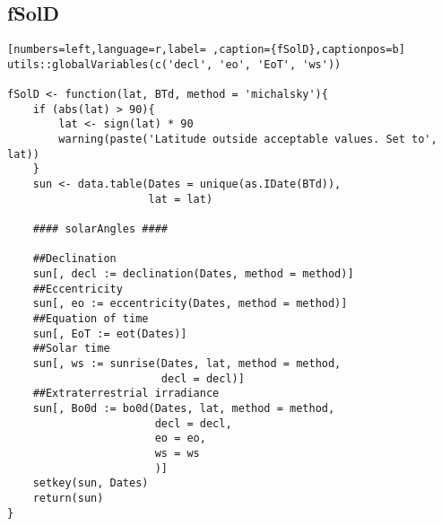 \subsection{fSolD}
\label{sec:orgf91d671}
\label{subsec:fsold}
\begin{lstlisting}[numbers=left,language=r,label= ,caption={fSolD},captionpos=b]
utils::globalVariables(c('decl', 'eo', 'EoT', 'ws'))

fSolD <- function(lat, BTd, method = 'michalsky'){
    if (abs(lat) > 90){
        lat <- sign(lat) * 90
        warning(paste('Latitude outside acceptable values. Set to', lat))
    }
    sun <- data.table(Dates = unique(as.IDate(BTd)),
                      lat = lat)

    #### solarAngles ####

    ##Declination
    sun[, decl := declination(Dates, method = method)]
    ##Eccentricity
    sun[, eo := eccentricity(Dates, method = method)]
    ##Equation of time
    sun[, EoT := eot(Dates)]
    ##Solar time
    sun[, ws := sunrise(Dates, lat, method = method,
                        decl = decl)]
    ##Extraterrestrial irradiance
    sun[, Bo0d := bo0d(Dates, lat, method = method,
                       decl = decl,
                       eo = eo,
                       ws = ws
                       )]
    setkey(sun, Dates)
    return(sun)
}
\end{lstlisting}
